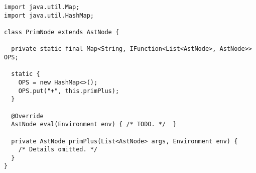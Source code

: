 \begin{lstlisting}[language=MyJava]
import java.util.Map;
import java.util.HashMap;

class PrimNode extends AstNode {
  
  private static final Map<String, IFunction<List<AstNode>, AstNode>> OPS;
  
  static {
    OPS = new HashMap<>();
    OPS.put("+", this.primPlus);
  }

  @Override
  AstNode eval(Environment env) { /* TODO. */  }

  private AstNode primPlus(List<AstNode> args, Environment env) { 
    /* Details omitted. */ 
  }
}
\end{lstlisting}

